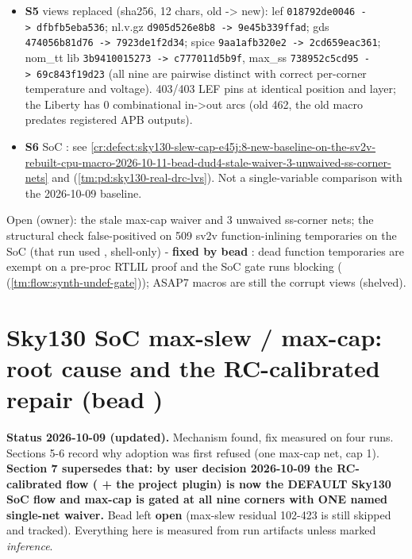 \begin{record}
\begin{itemize}
\item
  \textbf{S5} views replaced (sha256, 12 chars, old -\textgreater{}
  new): lef \texttt{018792de0046\ -\allowbreak{}>\ dfbfb5eba536};
  nl.v.gz \texttt{d905d526e8b8\ -\allowbreak{}>\ 9e45b339ffad}; gds
  \texttt{474056b81d76\ -\allowbreak{}>\ 7923de1f2d34}; spice
  \texttt{9aa1afb320e2\ -\allowbreak{}>\ 2cd659eac361}; nom\_tt lib
  \texttt{3b9410015273\ -\allowbreak{}>\ c777011d5b9f}, max\_ss
  \texttt{738952c5cd95\ -\allowbreak{}>\ 69c843f19d23} (all nine are
  pairwise distinct with correct per-corner temperature and voltage).
  403/403 LEF pins at identical position and layer; the Liberty has 0
  combinational in-\textgreater out arcs (old 462, the old macro
  predates registered APB outputs).
\item
  \textbf{S6} SoC : see
  \cref{cr:defect:sky130-slew-cap-e45j:8-new-baseline-on-the-sv2v-rebuilt-cpu-macro-2026-10-11-bead-dud4-stale-waiver-3-unwaived-ss-corner-nets} and
   (\cref{tm:pd:sky130-real-drc-lvs}). Not a single-variable
  comparison with the 2026-10-09 baseline.
\end{itemize}

Open (owner): the stale  max-cap waiver and 3
unwaived ss-corner nets; the  structural 
check false-positived on 509 sv2v function-inlining temporaries on the
SoC (that run used , shell-only) -
\textbf{fixed by bead }: dead function temporaries are exempt
on a pre-proc RTLIL proof and the SoC gate runs blocking
( (\cref{tm:flow:synth-undef-gate})); ASAP7 macros are still the corrupt
views (shelved).

\end{record}

\section{\texorpdfstring{Sky130 SoC max-slew / max-cap: root cause and
the RC-calibrated repair (bead
)}{Sky130 SoC max-slew / max-cap: root cause and the RC-calibrated repair (bead )}}\label{cr:defect:sky130-slew-cap-e45j}

\begin{record}

\textbf{Status 2026-10-09 (updated).} Mechanism found, fix measured on
four runs. Sections 5-6 record why adoption was first refused (one
max-cap net, cap 1). \textbf{Section 7 supersedes that: by user decision
2026-10-09 the RC-calibrated flow ( + the
project plugin) is now the DEFAULT Sky130 SoC flow and max-cap is gated
at all nine corners with ONE named single-net waiver.} Bead left
\textbf{open} (max-slew residual 102-423 is still skipped and tracked).
Everything here is measured from run artifacts unless marked
\emph{inference}.

\end{record}

